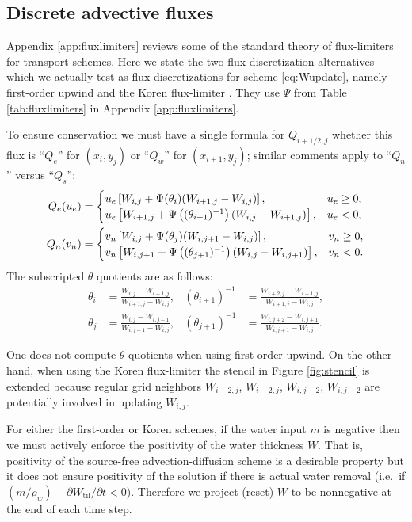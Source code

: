 \documentclass[11pt,final]{amsart}
\newcommand{\Wtil}{W_{\text{til}}}
\begin{document}
\subsection*{Discrete advective fluxes}  Appendix \ref{app:fluxlimiters} reviews some of the standard theory of flux-limiters for transport schemes.  Here we state the two flux-discretization alternatives which we actually test as flux discretizations for scheme \eqref{eq:Wupdate}, namely first-order upwind and the Koren flux-limiter \citep{HundsdorferVerwer2010}.  They use $\Psi$ from Table \ref{tab:fluxlimiters} in Appendix \ref{app:fluxlimiters}.

To ensure conservation we must have a single formula for $Q_{i+1/2,j}$ whether this flux is ``$Q_e$'' for $(x_i,y_j)$ or ``$Q_w$'' for $(x_{i+1},y_j)$; similar comments apply to ``$Q_n$'' versus ``$Q_s$'':
\begin{align}
Q_e(u_e) &= \begin{cases} u_e \left[W_{i,j} + \Psi(\theta_{i}) (W_{i+1,j} - W_{i,j})\right], & u_e \ge 0, \\ u_e \left[W_{i+1,j} + \Psi\left((\theta_{i+1})^{-1}\right) (W_{i,j} - W_{i+1,j})\right], & u_e < 0, \end{cases} \label{eq:adfluxes} \\
Q_n(v_n) &= \begin{cases} v_n \left[W_{i,j} + \Psi(\theta_{j}) (W_{i,j+1} - W_{i,j})\right], & v_n \ge 0, \\ v_n \left[W_{i,j+1} + \Psi\left((\theta_{j+1})^{-1}\right) (W_{i,j} - W_{i,j+1})\right], & v_n < 0. \end{cases} \notag
\end{align}
The subscripted $\theta$ quotients are as follows:
\begin{align*}
\theta_i &= \frac{W_{i,j}-W_{i-1,j}}{W_{i+1,j} - W_{i,j}}, & (\theta_{i+1})^{-1} &= \frac{W_{i+2,j}-W_{i+1,j}}{W_{i+1,j} - W_{i,j}}, \\
\theta_j &= \frac{W_{i,j}-W_{i,j-1}}{W_{i,j+1} - W_{i,j}}, & (\theta_{j+1})^{-1} &= \frac{W_{i,j+2}-W_{i,j+1}}{W_{i,j+1} - W_{i,j}}.
\end{align*}

One does not compute $\theta$ quotients when using first-order upwind.  On the other hand, when using the Koren flux-limiter the stencil in Figure \ref{fig:stencil} is extended because regular grid neighbors $W_{i+2,j}$, $W_{i-2,j}$, $W_{i,j+2}$, $W_{i,j-2}$ are potentially involved in updating $W_{i,j}$.

For either the first-order or Koren schemes, if the water input $m$ is negative then we must actively enforce the positivity of the water thickness $W$.  That is, positivity of the source-free advection-diffusion scheme is a desirable property but it does not ensure positivity of the solution if there is actual water removal (i.e.~if $(m/\rho_w) - \partial \Wtil/\partial t < 0$).  Therefore we project (reset) $W$ to be nonnegative at the end of each time step.
\end{document}
